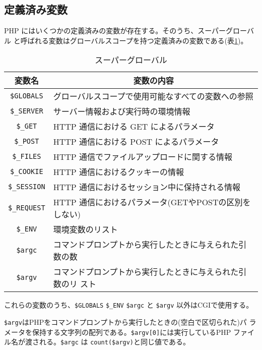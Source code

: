\subsection{定義済み変数}
PHP にはいくつかの定義済みの変数が存在する。そのうち、スーパーグローバル
と呼ばれる変数はグローバルスコープを持つ定義済みの変数である(表\ref{superglobal})。
\begin{table}[ht]
 \caption{スーパーグローバル}\label{superglobal}
\begin{center}
 \begin{tabular}{|c|m{}|}\hline
  変数名& \multicolumn{1}{c|}{変数の内容}\\\hline
\Verb+$GLOBALS+ & グローバルスコープで使用可能なすべての変数への参照\\\hline
\Verb+$_SERVER+ & サーバー情報および実行時の環境情報\\\hline
\Verb+$_GET+ & HTTP 通信における GET によるパラメータ\\\hline
\Verb+$_POST+ & HTTP 通信における POST によるパラメータ\\\hline
\Verb+$_FILES+ & HTTP 通信でファイルアップロードに関する情報\\\hline
  \Verb+$_COOKIE+ & HTTP 通信におけるクッキーの情報\\\hline
\Verb+$_SESSION+ &HTTP 通信におけるセッション中に保持される情報 \\\hline
\Verb+$_REQUEST+ & HTTP 通信におけるパラメータ(GETやPOSTの区別をしない)\\\hline
\Verb+$_ENV+  &  環境変数のリスト\\\hline
\Verb+$argc+  &  コマンドプロンプトから実行したときに与えられた引数の数\\\hline
\Verb+$argv+  &  コマンドプロンプトから実行したときに与えられた引数のリ
      スト\\\hline
 \end{tabular}
\end{center}
\end{table}

これらの変数のうち、\Verb+$GLOBALS+ \Verb+$_ENV+ \Verb+$argc+ と
\Verb+$argv+ 以外はCGIで使用する。

\Verb+$argv+はPHPをコマンドプロンプトから実行したときの(空白で区切られた)パ
ラメータを保持する文字列の配列である。\Verb+$argv[0]+には実行しているPHP
ファイル名が渡される。\Verb+$argc+ は \Verb+count($argv)+と同じ値である。
